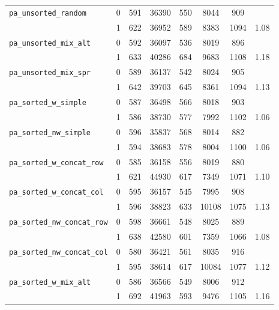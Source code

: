 \begin{table}[h]
\begin{tabular}{|l|c||c|c|c|c|c||c|}
		\verb|pa_unsorted_random| & 0 & 591 & 36390 & 550 & 8044 & 909 & \\ %
		& 1 & 622 & 36952 & 589 & 8383 & 1094 & 1.08 \\ \hline %
		
		\verb|pa_unsorted_mix_alt| & 0 & 592 & 36097 & 536 & 8019 & 896 & \\ %
		& 1 &  633 & 40286 & 684 & 9683 & 1108 & 1.18 \\ \hline %
		
		\verb|pa_unsorted_mix_spr| & 0 & 589 & 36137 & 542 & 8024 & 905 & \\ %
		& 1 &  642 & 39703 & 645 & 8361 & 1094 & 1.13 \\ \hline %
		
		\verb|pa_sorted_w_simple| & 0 & 587 & 36498 & 566 & 8018 & 903 & \\ %
		& 1 &  586 & 38730 & 577 & 7992 & 1102 & 1.06 \\ \hline %
		
		\verb|pa_sorted_nw_simple| & 0 & 596 & 35837 & 568 & 8014 & 882 & \\ %
		& 1 &  594 & 38683 & 578 & 8004 & 1100 & 1.06 \\ \hline %
		
		\verb|pa_sorted_w_concat_row| & 0 & 585 & 36158 & 556 & 8019 & 880 & \\ %
		& 1 &  621 & 44930 & 617 & 7349 & 1071& 1.10 \\ \hline %
		
		\verb|pa_sorted_w_concat_col| & 0 & 595 & 36157 & 545 & 7995 & 908 &  \\ %
		& 1 &  596 & 38823 & 633 & 10108 & 1075 & 1.13 \\ \hline %
		
		\verb|pa_sorted_nw_concat_row| & 0 & 598 & 36661 & 548 & 8025 & 889 & \\ %
		& 1 & 638 & 42580 & 601 & 7359 & 1066 & 1.08 \\ \hline %
		
		\verb|pa_sorted_nw_concat_col| & 0 & 580 & 36421 & 561 & 8035 & 916 & \\ %
		& 1 & 595 & 38614 & 617 &  10084  & 1077 & 1.12 \\ \hline %
		
		\verb|pa_sorted_w_mix_alt| & 0 &  586 & 36566 & 549 & 8006  & 912 & \\ %
		& 1 & 692 & 41963 & 593 & 9476 & 1105 & 1.16 \\ \hline %
		

\end{tabular}
\end{table}
